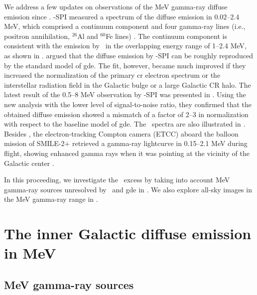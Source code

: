 \documentclass[a4paper,11pt]{article}
\begin{document}
We address a few updates on observations of the MeV gamma-ray diffuse emission since \comptel.
\integral-SPI measured a spectrum of the diffuse emission in 0.02–2.4 MeV, which comprised a continuum component and four gamma-ray lines (i.e., positron annihilation, $^{26}$Al and $^{60}$Fe lines) \citep{bouchet_diffuse_2011}.
The continuum component is consistent with the emission by \comptel\ in the overlapping energy range of 1–2.4 MeV, as shown in .
\cite{bouchet_diffuse_2011} argued that the diffuse emission by \integral-SPI can be roughly reproduced by the standard model of \ac{gde}.
The fit, however, became much improved if they increased the normalization of the primary \ac{cr} electron spectrum or the interstellar radiation field in the Galactic bulge or a large Galactic CR halo.
The latest result of the 0.5--8 MeV observation by \integral-SPI was presented in \cite{siegert_diffuse_2022}.
Using the new analysis with the lower level of signal-to-noise ratio, they confirmed that the obtained diffuse emission showed a mismatch of a factor of 2–3 in normalization with respect to the baseline model of \ac{gde}.
The \spi\ spectra are also illustrated in .
Besides \spi, the electron-tracking Compton camera (ETCC) aboard the balloon mission of SMILE-2$+$ retrieved a gamma-ray lightcurve %
in 0.15–2.1 MeV during flight, showing enhanced gamma rays when it was pointing at the vicinity of the Galactic center \citep{takada_first_2022}.
\fi


In this proceeding, we investigate the \comptel\ excess by taking into account MeV gamma-ray sources unresolved by \comptel\ and \ac{gde} in . We also explore all-sky images in the MeV gamma-ray range in . 




\section{%
The inner Galactic diffuse emission in MeV}
\label{sec:analysis}

\subsection{MeV gamma-ray sources}
\label{sec:sources}
\end{document}
